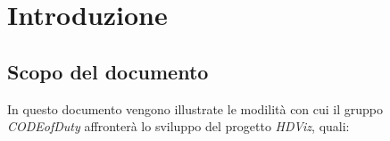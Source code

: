 \section{Introduzione}
\subsection{Scopo del documento}
	In questo documento vengono illustrate le modilità con cui il gruppo \emph{CODEofDuty} affronterà lo sviluppo del progetto \emph{HDViz}, quali: